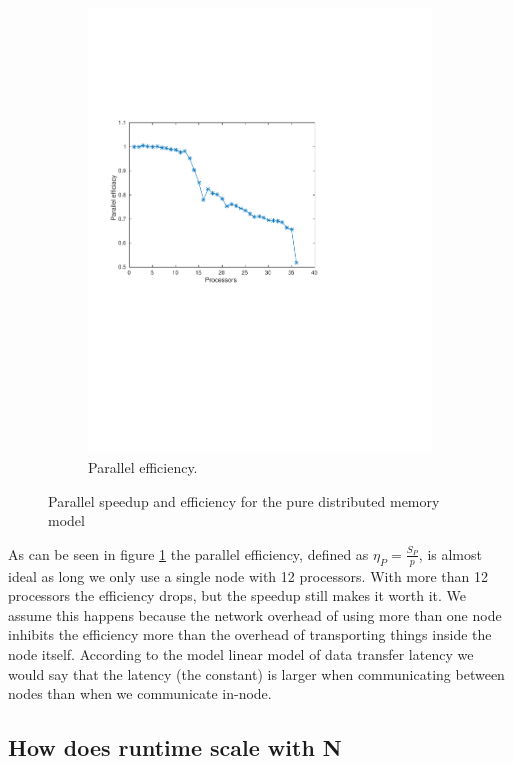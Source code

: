 \begin{figure}
\begin{subfigure}[b]{0.45\textwidth}
			\includegraphics[width=\textwidth]{./figures/efficiacy}
			\caption{Parallel efficiency.}
			\label{fig:efficiacy}
        \end{subfigure}%
        \caption{Parallel speedup and efficiency for the pure distributed memory model}
        \label{fig:analysis}
\end{figure}

As can be seen in figure \ref{fig:efficiacy} the parallel efficiency, defined as $\eta_P=\frac{S_P}{p}$, is almost ideal as long we only use a single node with 12 processors. With more than 12 processors the efficiency drops, but the speedup still makes it worth it. We assume this happens because the network overhead of using more than one node inhibits the efficiency more than the overhead of transporting things inside the node itself. According to the model linear model of data transfer latency we would say that the latency (the constant) is larger when communicating between nodes than when we communicate in-node.


\subsection*{How does runtime scale with N}